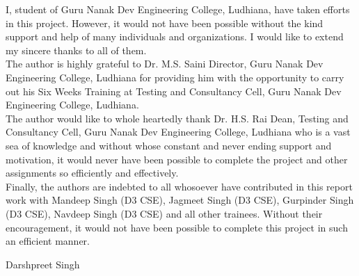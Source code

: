 \begin{Large}
\end{Large}
I, student of Guru Nanak Dev Engineering College, Ludhiana, have taken efforts in this project.
However, it would not have been possible without the kind support and help of many individuals
and organizations. I would like to extend my sincere thanks to all of them.\\
The author is highly grateful to Dr. M.S. Saini Director, Guru Nanak Dev Engineering College, Ludhiana for providing him with the opportunity to carry out his Six Weeks Training at
Testing and Consultancy Cell, Guru Nanak Dev Engineering College, Ludhiana.\\
The author would like to whole heartedly thank Dr. H.S. Rai Dean, Testing and Consultancy
Cell, Guru Nanak Dev Engineering College, Ludhiana who is a vast sea of knowledge and without whose constant and never ending support and motivation, it would never have been possible to complete the project and other assignments so efficiently and effectively.\\
Finally, the authors are indebted to all whosoever have contributed in
this report work with Mandeep Singh (D3 CSE), Jagmeet Singh (D3 CSE), Gurpinder Singh (D3 CSE), Navdeep Singh (D3 CSE) and all other trainees. Without their 
encouragement, it would not have been possible to complete this project
in such an efficient manner.





\vskip 1.0cm 
\noindent Darshpreet Singh
